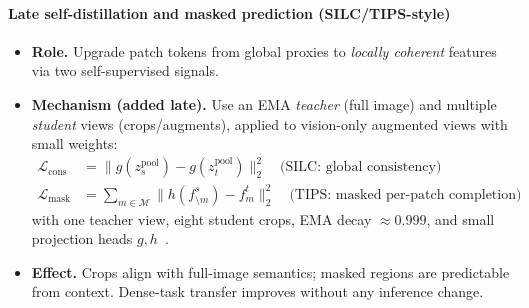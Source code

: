 \begin{enrichment}
\begin{enrichment}
        \paragraph{Late self-distillation and masked prediction (SILC/TIPS-style)}
        \begin{itemize}
            \item \textbf{Role.} Upgrade patch tokens from global proxies to \emph{locally coherent} features via two self-supervised signals.
            \item \textbf{Mechanism (added late).} Use an EMA \emph{teacher} (full image) and multiple \emph{student} views (crops/augments), applied to vision-only augmented views with small weights:
            \begin{align*}
                \mathcal{L}_\text{cons} &= \| g(z^\text{pool}_s) - g(z^\text{pool}_t) \|_2^2 \quad\text{(SILC: global consistency)}\\
                \mathcal{L}_\text{mask} &= \sum_{m\in\mathcal{M}} \big\| h(f^s_{\setminus m}) - f^t_m \big\|_2^2 \quad\text{(TIPS: masked per-patch completion)}
            \end{align*}
            with one teacher view, eight student crops, EMA decay $\approx 0.999$, and small projection heads $g,h$~\cite{naeem2023_silc,maninis2025_tips}.
            \item \textbf{Effect.} Crops align with full-image semantics; masked regions are predictable from context. Dense-task transfer improves without any inference change.
        \end{itemize}
        

\end{enrichment}
\end{enrichment}
